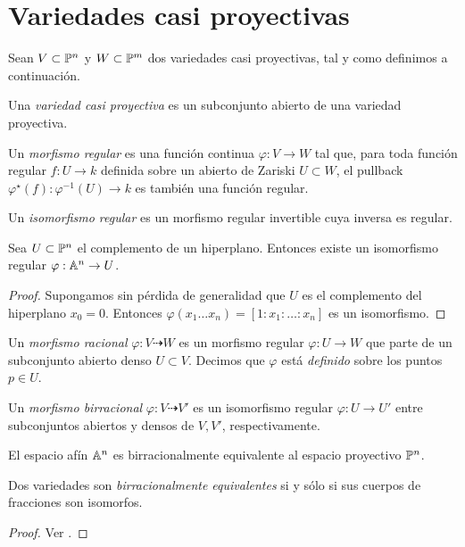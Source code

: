 \section{Variedades casi proyectivas}

\begin{preliminaries}
Sean $V \subset \P^n$ y $W \subset \P^m$ dos variedades casi proyectivas, tal y como definimos a continuación.
\end{preliminaries}

\begin{definition}
Una \textit{variedad casi proyectiva} es un subconjunto abierto de una variedad proyectiva.
\end{definition}

\begin{definition}
Un \textit{morfismo regular} es una función continua $\varphi : V \to W$ tal que, para toda función regular $f : U \to k$ definida sobre un abierto de Zariski $U \subset W$, el pullback $\varphi^\star(f) : \varphi^{-1}(U) \to k$ es también una función regular.
\end{definition}

\begin{definition}
Un \textit{isomorfismo regular} es un morfismo regular invertible cuya inversa es regular.
\end{definition}

\begin{proposition}
Sea $U \subset \P^n$ el complemento de un hiperplano. Entonces existe un isomorfismo regular $\varphi : \A^n \to U$.
\end{proposition}

\begin{proof}
Supongamos sin pérdida de generalidad que $U$ es el complemento del hiperplano $x_0 = 0$. Entonces $\varphi(x_1 \dots x_n) = [1 : x_1 : \dots : x_n]$ es un isomorfismo.
\end{proof}

\begin{definition}
Un \textit{morfismo racional} $\varphi : V \dashrightarrow W$ es un morfismo regular $\varphi : U \to W$ que parte de un subconjunto abierto denso $U \subset V$. Decimos que $\varphi$ está \textit{definido} sobre los puntos $p \in U$.
\end{definition}

\begin{definition}
Un \textit{morfismo birracional} $\varphi : V \dashrightarrow V'$ es un isomorfismo regular $\varphi : U \to U'$ entre subconjuntos abiertos y densos de $V, V'$, respectivamente.
\end{definition}

\begin{example}
El espacio afín $\A^n$ es birracionalmente equivalente al espacio proyectivo $\P^n$.
\end{example}

\begin{proposition}
Dos variedades son \textit{birracionalmente equivalentes} si y sólo si sus cuerpos de fracciones son isomorfos.
\end{proposition}

\begin{proof}
Ver \cite[p. 155]{fulton}.
\end{proof}
